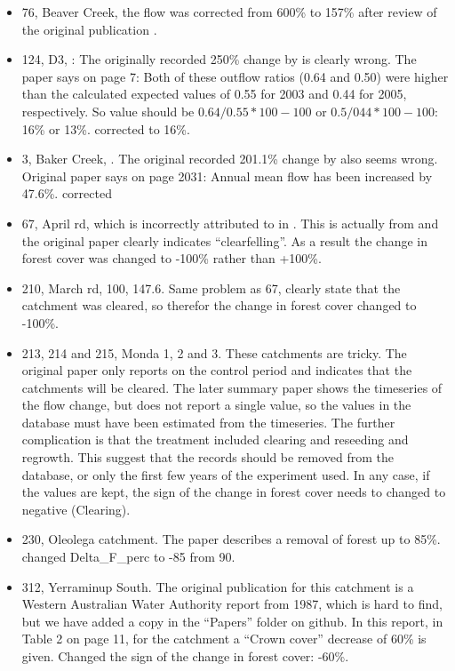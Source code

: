 \documentclass[]{elsarticle} %
\providecommand{\tightlist}{%
  \setlength{\itemsep}{0pt}\setlength{\parskip}{0pt}}
\begin{document}
\begin{itemize}
\tightlist
\item
  76, Beaver Creek, the flow was corrected from 600\% to 157\% after review of the original publication \citep{baker1984}.
\item
  124, D3, \citet{amatya2008effects}: The originally recorded 250\% change by \citet{zhang2017} is clearly wrong. The paper says on page 7: Both of these outflow ratios (0.64 and 0.50) were higher than the calculated expected values of 0.55 for 2003 and 0.44 for 2005, respectively. So value should be \(0.64/0.55*100 - 100\) or \(0.5/044*100 - 100\): 16\% or 13\%. corrected to 16\%.
\item
  3, Baker Creek, \citet{zhangwei2012}. The original recorded 201.1\% change by \citet{zhang2017} also seems wrong. Original paper says on page 2031: Annual mean flow has been increased by 47.6\%. corrected\\
\item
  67, April rd, which is incorrectly attributed to \citet{ruprecht1991} in \citet{zhang2017}. This is actually from \citet{ruprecht1989} and the original paper clearly indicates ``clearfelling''. As a result the change in forest cover was changed to -100\% rather than +100\%.
\item
  210, March rd, 100, 147.6. Same problem as 67, \citet{bari1996} clearly state that the catchment was cleared, so therefor the change in forest cover changed to -100\%.
\item
  213, 214 and 215, Monda 1, 2 and 3. These catchments are tricky. The original paper \citep{oshaughnessy1979} only reports on the control period and indicates that the catchments will be cleared. The later summary paper \citep{watson2001} shows the timeseries of the flow change, but does not report a single value, so the values in the database must have been estimated from the timeseries. The further complication is that the treatment included clearing and reseeding and regrowth. This suggest that the records should be removed from the database, or only the first few years of the experiment used. In any case, if the values are kept, the sign of the change in forest cover needs to changed to negative (Clearing).
\item
  230, Oleolega catchment. The paper describes a removal of forest up to 85\%. changed Delta\_F\_perc to -85 from 90.
\item
  312, Yerraminup South. The original publication for this catchment is a Western Australian Water Authority report from 1987, which is hard to find, but we have added a copy in the ``Papers'' folder on github. In this report, in Table 2 on page 11, for the catchment a ``Crown cover'' decrease of 60\% is given. Changed the sign of the change in forest cover: -60\%.

\end{itemize}
\end{document}
